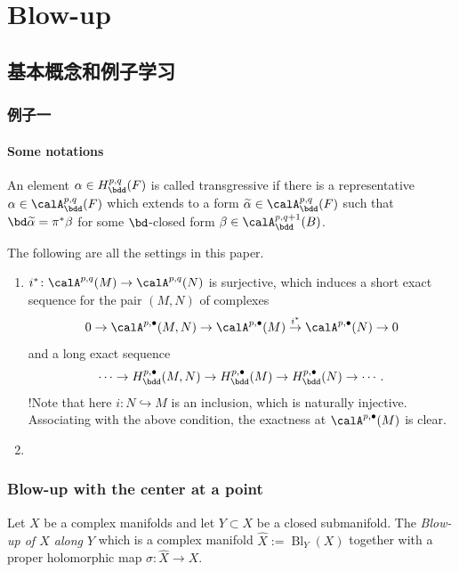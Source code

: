 \chapter{Blow-up}
\section{基本概念和例子学习}
\subsection{例子一}
\subsubsection{Some notations}

\begin{definition}[][transgressive]
    An element $\alpha\in H^{p,q}_{\bdd}(F)$  is called transgressive if there is a representative $\alpha\in \calA^{p,q}_{\bdd}(F)$ which extends to a form $\widetilde{\alpha}\in \calA^{p,q}_{\bdd}(F)$ such that $\bd\widetilde{\alpha}=\pi^*\beta$ for some $\bd$-closed form $\beta\in \calA^{p,q+1}_{\bdd}(B)$.
\end{definition}

The following are all the settings in this paper.
\begin{enumerate}
    \item $i^*\colon \calA^{p,q}(M)\to\calA^{p,q}(N)$ is surjective, which induces a short exact sequence for the pair $(M,N)$ of complexes 
    \[
        0\to\calA^{p,\bullet}(M,N)\to \calA^{p,\bullet}(M)\stackrel{i^*}{\to}\calA^{p,\bullet}(N)\to 0
    \]
     and a long exact sequence
     \[
        \cdots\to H^{p,\bullet}_{\bdd} (M,N)\to H^{p,\bullet}_{\bdd} (M) \to H^{p,\bullet}_{\bdd} (N)\to \cdots.
     \]
     !Note that here $i\colon N\hookrightarrow M$ is an inclusion, which is naturally injective. Associating with the above condition, the exactness at $\calA^{p,\bullet}(M)$ is clear.
    \item 
\end{enumerate}

\subsection{Blow-up with the center at a point}

\begin{definition}[][Blow-up]
    Let $X$ be a complex manifolds and let $Y\subset X$ be a closed submanifold. The \textit{Blow-up of $X$ along $Y$} which is a complex manifold $\widehat{X}:=\operatorname{Bl}_Y (X)$ together with a proper holomorphic map $\sigma\colon \widehat{X}\to X$.
\end{definition}



